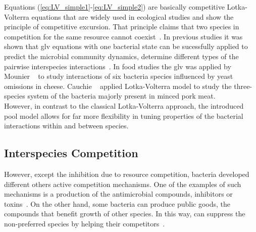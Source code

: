 \documentclass[10pt,A4paper]{article}
\begin{document}
%
Equations (\ref{eq:LV_simple1}-\ref{eq:LV_simple2}) are basically competitive Lotka-Volterra equations that are widely used in ecological studies and show the principle of competitive excursion.
That principle claims that two species in competition for the same resource cannot coexist~\cite{wangersky_lotka-volterra_1978}. 
In previous studies it was shown that \ac{glv} equations with one bacterial state can be sucessfully applied to predict the microbial community dynamics, determine different types of the pairwise interspecies interactions~\cite{dedrick_when_2023, stein_ecological_2013, venturelli_deciphering_2018, hoffmann_power_2007}.
In food studies the \ac{glv} was applied by Mounier \etal~\cite{mounier_microbial_2008} to study interactions of six bacteria species influenced by yeast omissions in cheese.
Cauchie \etal~\cite{cauchie_modeling_2020} applied Lotka-Volterra model to study the three-species system of the bacteria majorly present in minced pork meat.\\
%
However, in contrast to the classical Lotka-Volterra approach, the introduced pool model allows for far more flexibility in tuning properties of the bacterial interactions within and between species. 
%
%
%
%
\subsection{Interspecies Competition}
However, except the inhibition due to resource competition, bacteria developed different others active competition mechanisms.
One of the examples of such mechanisms is a production of the antimicrobial compounds, inhibitors or toxins~\cite{wloch-salamon_effect_2008, chao_structured_1981}.
On the other hand, some bacteria can produce public goods, the compounds that benefit growth of other species.
In this way, can suppress the non-preferred species by helping their competitors~\cite{hibbing_bacterial_2010}.
%
%
\end{document}
